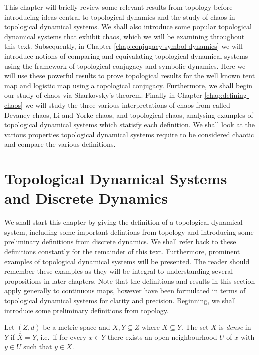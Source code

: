 This chapter will briefly review some relevant results from topology before introducing ideas central to topological dynamics and the study of chaos in topological dynamical systems. We shall also introduce some popular topological dynamical systems that exhibit chaos, which we will be examining throughout this text. Subsequently, in Chapter \ref{chap:conjugacy-symbol-dynamics} we will introduce notions of comparing and equivalating topological dynamical systems using the framework of topological conjugacy and symbolic dynamics. Here we will use these powerful results to prove topological results for the well known tent map and logistic map using a topological conjugacy. Furthermore, we shall begin our study of chaos via Sharkovsky's theorem. Finally in Chapter \ref{chap:defining-chaos} we will study the three various interpretations of chaos from called Devaney chaos, Li and Yorke chaos, and topological chaos, analysing examples of topological dynamical systems which statisfy each definition. We shall look at the various properties topological dynamical systems require to be considered chaotic and compare the various definitions.

\section{Topological Dynamical Systems and Discrete Dynamics} \label{sec:topological-dynamical-systems}
We shall start this chapter by giving the definition of a topological dynamical system, including some important defintions from topology and introducing some preliminary definitions from discrete dynamics. We shall refer back to these definitions constantly for the remainder of this text. Furthermore, prominent examples of topological dynamical systems will be presented. The reader should remember these examples as they will be integral to understanding several propositions in later chapters. Note that the definitions and results in this section apply generally to continuous maps, however have been formulated in terms of topological dynamical systems for clarity and precision. Beginning, we shall introduce some preliminary definitions from topology.

\begin{defn} \label{defn:dense}
    Let $(Z, d)$ be a metric space and $X, Y \subseteq Z$ where $X \subseteq Y$. The set $X$ is \emph{dense} in $Y$ if $\overline{X} = Y$, i.e.\ if for every $x \in Y$ there exists an open neighbourhood $U$ of $x$ with $y \in U$ such that $y \in X$.
\end{defn}

